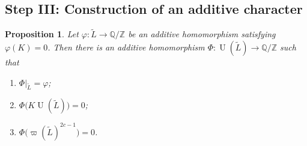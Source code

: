 \documentclass[a4paper,11pt,reqno]{amsart}
\newtheorem{proposition}[theorem]{Proposition}
\theoremstyle{definition}
\newcommand{\Z}{\mathbb Z}
\newcommand{\Q}{\mathbb Q}
\newcommand{\D}{\Q/\Z}
\newcommand{\U}{\operatorname U}
\begin{document}
\subsection*{Step III: Construction of an additive character}

\begin{proposition}\label{prop:additive-character}
Let $\varphi:\widetilde L\to\D$ be an additive homomorphism satisfying
$\varphi(K)=0$.  Then there is an additive homomorphism
$\Phi:\U(\widetilde L)\to\D$ such that
\begin{enumerate}[label=\textup{(\arabic*)},leftmargin=2em,nosep]
 \item $\Phi|_{\widetilde L}=\varphi$;
 \item $\Phi\bigl(K\U(\widetilde L)\bigr)=0$;
 \item
 $\Phi\bigl(\varpi(\widetilde L)^{2c-1}\bigr)=0$.
\end{enumerate}
\end{proposition}
\end{document}
